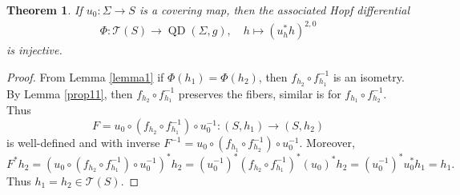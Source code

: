 \documentclass[11pt]{amsart}
\numberwithin{equation}{section}
\def\mc{\mathcal}
\theoremstyle{plain}
\newtheorem{thm}{Theorem}[section]
\theoremstyle{definition}
\theoremstyle{definition}
\def\op{\operatorname}
\begin{document}
\begin{thm}
If $u_0:\Sigma\to S$ is a covering map, then the associated Hopf differential 	
\begin{align*}
	\Phi: \mc{T}(S)\to \op{QD}(\Sigma,g),\quad h \mapsto (u^*_hh)^{2,0}
\end{align*}
is injective.
\end{thm}
\begin{proof}
From Lemma \ref{lemma1} if $\Phi(h_1)=\Phi(h_2)$, then $f_{h_2}\circ f_{h_1}^{-1}$ is an isometry. By Lemma \ref{prop11}, then 	$f_{h_2}\circ f_{h_1}^{-1}$ preserves the fibers, similar is for $f_{h_1}\circ f_{h_2}^{-1}$. Thus $$F=u_0\circ (f_{h_2}\circ f_{h_1}^{-1})\circ u_0^{-1}:(S,h_1)\to (S,h_2)$$
is well-defined and with inverse $F^{-1}=u_0\circ (f_{h_1}\circ f_{h_2}^{-1})\circ u_0^{-1}$. Moreover, 
$$F^*h_2=(u_0\circ (f_{h_2}\circ f_{h_1}^{-1})\circ u_0^{-1})^*h_2=(u_0^{-1})^*(f_{h_2}\circ f_{h_1}^{-1})^*(u_0)^*h_2=(u_0^{-1})^*u_0^*h_1=h_1.$$
Thus $h_1=h_2\in\mc{T}(S)$. 
\end{proof}
\end{document}

